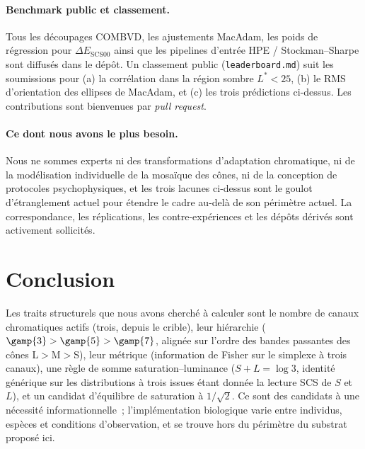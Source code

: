 \documentclass[12pt,a4paper]{article}
\begin{document}
\paragraph{Benchmark public et classement.}
Tous les d\'ecoupages COMBVD, les ajustements MacAdam, les poids de
r\'egression pour $\Delta E_{\mathrm{SCS00}}$ ainsi que les pipelines
d'entr\'ee HPE / Stockman--Sharpe sont diffus\'es dans le d\'ep\^ot.
Un classement public (\texttt{leaderboard.md}) suit les soumissions
pour (a) la corr\'elation dans la r\'egion sombre $L^* < 25$, (b) le
RMS d'orientation des ellipses de MacAdam, et (c) les trois
pr\'edictions ci-dessus. Les contributions sont bienvenues par
\emph{pull request}.

\paragraph{Ce dont nous avons le plus besoin.}
Nous ne sommes experts ni des transformations d'adaptation
chromatique, ni de la mod\'elisation individuelle de la mosa\"ique des
c\^ones, ni de la conception de protocoles psychophysiques, et les
trois lacunes ci-dessus sont le goulot d'\'etranglement actuel pour
\'etendre le cadre au-del\`a de son p\'erim\`etre actuel. La
correspondance, les r\'eplications, les contre-exp\'eriences et les
d\'ep\^ots d\'eriv\'es sont activement sollicit\'es.

\section{Conclusion}
\label{sec:conclusion}

Les traits structurels que nous avons cherch\'e \`a calculer sont le
nombre de canaux chromatiques actifs (trois, depuis le crible), leur
hi\'erarchie ($\gamp{3} > \gamp{5} > \gamp{7}$, align\'ee sur l'ordre
des bandes passantes des c\^ones L$>$M$>$S), leur m\'etrique
(information de Fisher sur le simplexe \`a trois canaux), une r\`egle
de somme saturation--luminance ($S + L = \log 3$, identit\'e
g\'en\'erique sur les distributions \`a trois issues \'etant donn\'ee
la lecture SCS de $S$ et $L$), et un candidat d'\'equilibre de
saturation \`a $1/\sqrt{2}$. Ce sont des candidats \`a une
n\'ecessit\'e informationnelle~; l'impl\'ementation biologique varie
entre individus, esp\`eces et conditions d'observation, et se trouve
hors du p\'erim\`etre du substrat propos\'e ici.
\end{document}
